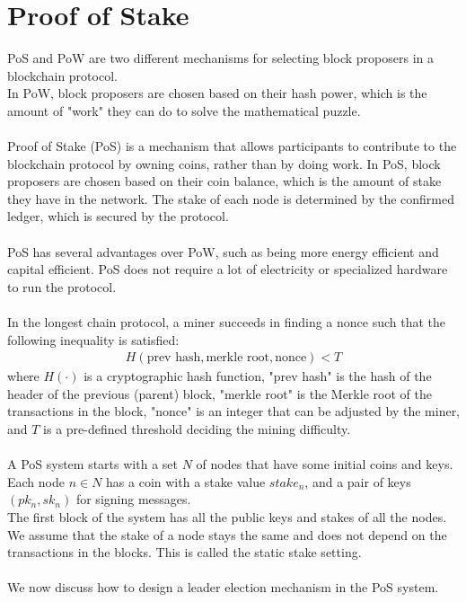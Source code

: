 \section{Proof of Stake}
PoS and PoW are two different mechanisms for selecting block proposers in a blockchain protocol.\\
In PoW, block proposers are chosen based on their hash power, which is the amount of "work" they can do to solve the mathematical puzzle.\\\\
Proof of Stake (PoS) is a mechanism that allows participants to contribute to the blockchain protocol by owning coins, rather than by doing work. In PoS, block proposers are chosen based on their coin balance, which is the amount of stake they have in the network. The stake of each node is determined by the confirmed ledger, which is secured by the protocol.\\\\
PoS has several advantages over PoW, such as being more energy efficient and capital efficient. PoS does not require a lot of electricity or specialized hardware to run the protocol.\\\\
In the longest chain protocol, a miner succeeds in finding a nonce such that the following inequality is satisfied:
\begin{align}
	H(\text{prev hash}, \text{merkle root}, \text{nonce}) < T
\end{align}
where $H(·)$ is a cryptographic hash function, "prev hash" is the hash of the header of the previous
(parent) block, "merkle root" is the Merkle root of the transactions in the block, "nonce" is an integer
that can be adjusted by the miner, and $T$ is a pre-defined threshold deciding the mining difficulty.\\\\
A PoS system starts with a set $N$ of nodes that have some initial coins and keys. Each node $n \in N$ has a coin with a stake value $stake_n$, and a pair of keys $(pk_n, sk_n) $ for signing messages.\\
The first block of the system has all the public keys and stakes of all the nodes. We assume that the stake of a node stays the same and does not depend on the transactions in the blocks. This is called the static stake setting.\\\\
We now discuss how to design a leader election mechanism in the PoS system.

